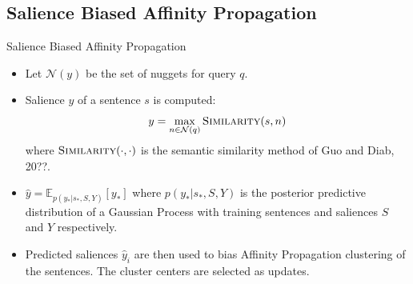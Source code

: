 \subsection{Salience Biased Affinity Propagation}

\begin{frame}{Salience Biased Affinity Propagation}

 \begin{itemize}
   \item Let $\mathcal{N}(y)$ be the set of nuggets for query $q$.
   \item Salience $y$ of a sentence $s$ is computed: \[y = \max_{n \in \mathcal{N}(q)} 
       \textsc{Similarity}(s,n)\]  where $\textsc{Similarity}(\cdot, \cdot)$
      is the semantic similarity method of Guo and Diab, 20??.
                \item $ \hat{y} = \mathbb{E}_{p(y_*|s_*,S,Y)} \left[y_*\right]$               where $p(y_*|s_*,S, Y)$ is the posterior predictive distribution
                    of a Gaussian Process with training sentences and saliences $S$ and $Y$ respectively.
                \item Predicted saliences $\hat{y}_i$ are then
                    used to bias Affinity Propagation clustering of the sentences. The cluster centers are selected as updates.
 \end{itemize}
\end{frame}

